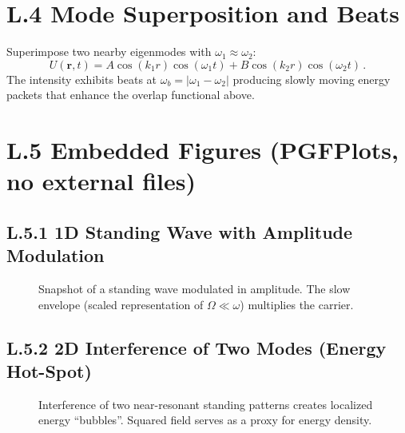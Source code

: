 \documentclass[12pt]{article}
\begin{document}
\section*{L.4 Mode Superposition and Beats}
Superimpose two nearby eigenmodes with $\omega_1\approx\omega_2$:
\begin{equation}
U(\mathbf{r},t)=A\cos(k_1 r)\cos(\omega_1 t)+B\cos(k_2 r)\cos(\omega_2 t)\,.
\end{equation}
The intensity exhibits beats at $\omega_b=|\omega_1-\omega_2|$ producing slowly moving energy packets that enhance the overlap functional above.

\section*{L.5 Embedded Figures (PGFPlots, no external files)}
\subsection*{L.5.1 1D Standing Wave with Amplitude Modulation}
\begin{figure}[h!]
\centering
{}
\caption{Snapshot of a standing wave modulated in amplitude. The slow envelope (scaled representation of $\Omega\ll\omega$) multiplies the carrier.}
\label{fig:L1D}
\end{figure}

\subsection*{L.5.2 2D Interference of Two Modes (Energy Hot-Spot)}
\begin{figure}[h!]
\centering
{}
\caption{Interference of two near-resonant standing patterns creates localized energy ``bubbles''. Squared field serves as a proxy for energy density.}
\label{fig:L2D}
\end{figure}
\end{document}
